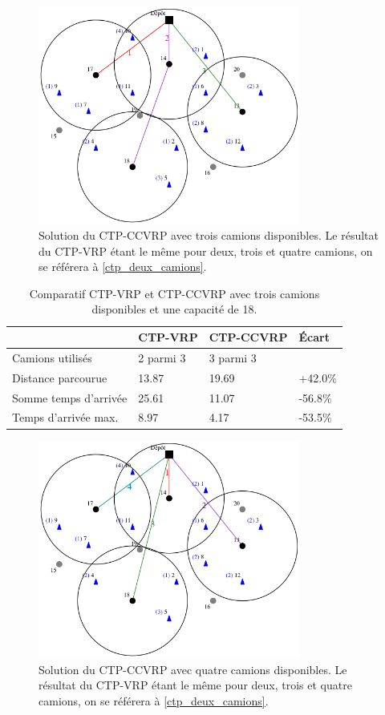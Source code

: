 \documentclass[5p,authoryear]{elsarticle}
\begin{document}
\begin{figure}[p] \centering
	\centerline{\includegraphics[width=3.4in]{figures/ctpccvrp_trois_camions}}
	\caption[]{Solution du CTP-CCVRP avec trois camions disponibles. Le résultat du CTP-VRP étant le même pour deux, trois et quatre camions, on se référera à \cref{ctp_deux_camions}.} \label{ctpccvrp_trois_camions}
\end{figure}


\begin{table}[p] \centering \begin{tabular}{@{\small}llll@{}} \toprule %
 & {\footnotesize CTP-VRP} &  {\footnotesize CTP-CCVRP} & Écart \\ \midrule
Camions utilisés & 2 parmi 3 & 3 parmi 3 &  \\
Distance parcourue & 13.87 & 19.69 & +42.0\% \\
Somme temps d'arrivée & 25.61 & 11.07 & -56.8\% \\
Temps d'arrivée max. & 8.97 & 4.17 & -53.5\% \\ \bottomrule
\end{tabular} \caption{Comparatif CTP-VRP et CTP-CCVRP avec trois camions disponibles et une capacité de 18.} \label{table_trois_camions}
\end{table}


\begin{figure}[p] \centering
	\centerline{\includegraphics[width=3.4in]{figures/ctpccvrp_quatre_camions}}
	\caption[]{Solution du CTP-CCVRP avec quatre camions disponibles. Le résultat du CTP-VRP étant le même pour deux, trois et quatre camions, on se référera à \cref{ctp_deux_camions}.} \label{ctpccvrp_trois_camions} \label{ctpccvrp_quatre_camions}
\end{figure}
\end{document}
